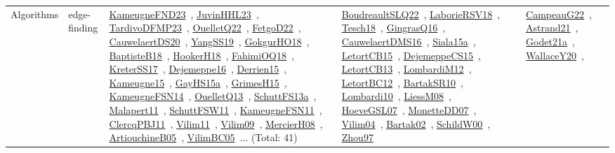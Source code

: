 {\begin{longtable}{lp{3cm}>{\raggedright\arraybackslash}p{6cm}>{\raggedright\arraybackslash}p{6cm}>{\raggedright\arraybackslash}p{8cm}}
Algorithms & edge-finding & \href{works/KameugneFND23.pdf}{KameugneFND23}~\cite{KameugneFND23}, \href{works/JuvinHHL23.pdf}{JuvinHHL23}~\cite{JuvinHHL23}, \href{works/TardivoDFMP23.pdf}{TardivoDFMP23}~\cite{TardivoDFMP23}, \href{works/OuelletQ22.pdf}{OuelletQ22}~\cite{OuelletQ22}, \href{works/FetgoD22.pdf}{FetgoD22}~\cite{FetgoD22}, \href{works/CauwelaertDS20.pdf}{CauwelaertDS20}~\cite{CauwelaertDS20}, \href{works/YangSS19.pdf}{YangSS19}~\cite{YangSS19}, \href{works/GokgurHO18.pdf}{GokgurHO18}~\cite{GokgurHO18}, \href{works/BaptisteB18.pdf}{BaptisteB18}~\cite{BaptisteB18}, \href{works/HookerH18.pdf}{HookerH18}~\cite{HookerH18}, \href{works/FahimiOQ18.pdf}{FahimiOQ18}~\cite{FahimiOQ18}, \href{works/KreterSS17.pdf}{KreterSS17}~\cite{KreterSS17}, \href{works/Dejemeppe16.pdf}{Dejemeppe16}~\cite{Dejemeppe16}, \href{works/Derrien15.pdf}{Derrien15}~\cite{Derrien15}, \href{works/Kameugne15.pdf}{Kameugne15}~\cite{Kameugne15}, \href{works/GayHS15a.pdf}{GayHS15a}~\cite{GayHS15a}, \href{works/GrimesH15.pdf}{GrimesH15}~\cite{GrimesH15}, \href{works/KameugneFSN14.pdf}{KameugneFSN14}~\cite{KameugneFSN14}, \href{works/OuelletQ13.pdf}{OuelletQ13}~\cite{OuelletQ13}, \href{works/SchuttFS13a.pdf}{SchuttFS13a}~\cite{SchuttFS13a}, \href{works/Malapert11.pdf}{Malapert11}~\cite{Malapert11}, \href{works/SchuttFSW11.pdf}{SchuttFSW11}~\cite{SchuttFSW11}, \href{works/KameugneFSN11.pdf}{KameugneFSN11}~\cite{KameugneFSN11}, \href{works/ClercqPBJ11.pdf}{ClercqPBJ11}~\cite{ClercqPBJ11}, \href{works/Vilim11.pdf}{Vilim11}~\cite{Vilim11}, \href{works/Vilim09.pdf}{Vilim09}~\cite{Vilim09}, \href{works/MercierH08.pdf}{MercierH08}~\cite{MercierH08}, \href{works/ArtiouchineB05.pdf}{ArtiouchineB05}~\cite{ArtiouchineB05}, \href{works/VilimBC05.pdf}{VilimBC05}~\cite{VilimBC05}... (Total: 41) & \href{works/BoudreaultSLQ22.pdf}{BoudreaultSLQ22}~\cite{BoudreaultSLQ22}, \href{works/LaborieRSV18.pdf}{LaborieRSV18}~\cite{LaborieRSV18}, \href{works/Tesch18.pdf}{Tesch18}~\cite{Tesch18}, \href{works/GingrasQ16.pdf}{GingrasQ16}~\cite{GingrasQ16}, \href{works/CauwelaertDMS16.pdf}{CauwelaertDMS16}~\cite{CauwelaertDMS16}, \href{works/Siala15a.pdf}{Siala15a}~\cite{Siala15a}, \href{works/LetortCB15.pdf}{LetortCB15}~\cite{LetortCB15}, \href{works/DejemeppeCS15.pdf}{DejemeppeCS15}~\cite{DejemeppeCS15}, \href{works/LetortCB13.pdf}{LetortCB13}~\cite{LetortCB13}, \href{works/LombardiM12.pdf}{LombardiM12}~\cite{LombardiM12}, \href{works/LetortBC12.pdf}{LetortBC12}~\cite{LetortBC12}, \href{works/BartakSR10.pdf}{BartakSR10}~\cite{BartakSR10}, \href{works/Lombardi10.pdf}{Lombardi10}~\cite{Lombardi10}, \href{works/LiessM08.pdf}{LiessM08}~\cite{LiessM08}, \href{works/HoeveGSL07.pdf}{HoeveGSL07}~\cite{HoeveGSL07}, \href{works/MonetteDD07.pdf}{MonetteDD07}~\cite{MonetteDD07}, \href{works/Vilim04.pdf}{Vilim04}~\cite{Vilim04}, \href{works/Bartak02.pdf}{Bartak02}~\cite{Bartak02}, \href{works/SchildW00.pdf}{SchildW00}~\cite{SchildW00}, \href{works/Zhou97.pdf}{Zhou97}~\cite{Zhou97} & \href{works/CampeauG22.pdf}{CampeauG22}~\cite{CampeauG22}, \href{works/Astrand21.pdf}{Astrand21}~\cite{Astrand21}, \href{works/Godet21a.pdf}{Godet21a}~\cite{Godet21a}, \href{works/WallaceY20.pdf}{WallaceY20}~\cite{WallaceY20}, 
\end{longtable}}
